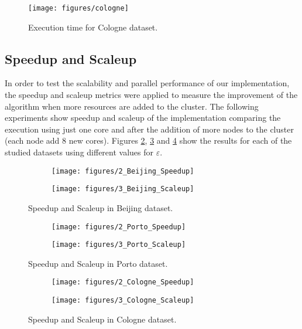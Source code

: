 \documentclass[12pt]{scrartcl}
\begin{document}
\begin{figure}
 \centering
 \texttt{[image: figures/cologne]} 
 \caption{Execution time for Cologne dataset.}
 \label{fig:cologne}
\end{figure}

\subsection{Speedup and Scaleup}
In order to test the scalability and parallel performance of our implementation, the speedup and scaleup metrics were applied to measure the improvement of the algorithm when more resources are added to the cluster.  The following experiments show speedup and scaleup of the implementation comparing the execution using just one core and after the addition of more nodes to the cluster (each node add 8 new cores).  Figures \ref{fig:SSBeijing}, \ref{fig:SSPorto} and \ref{fig:SSCologne} show the results for each of the studied datasets using different values for $\varepsilon$.

\begin{figure}
\centering
\begin{subfigure}{.5\textwidth}
  \centering \texttt{[image: figures/2\_Beijing\_Speedup]}
\end{subfigure}%
\begin{subfigure}{.5\textwidth}
  \centering \texttt{[image: figures/3\_Beijing\_Scaleup]}
\end{subfigure}
\caption{Speedup and Scaleup in Beijing dataset.}
\label{fig:SSBeijing}
\end{figure}

\begin{figure}
\centering
\begin{subfigure}{.5\textwidth}
  \centering \texttt{[image: figures/2\_Porto\_Speedup]}
\end{subfigure}%
\begin{subfigure}{.5\textwidth}
  \centering \texttt{[image: figures/3\_Porto\_Scaleup]}
\end{subfigure}
\caption{Speedup and Scaleup in Porto dataset.}
\label{fig:SSPorto}
\end{figure}

\begin{figure}
\centering
\begin{subfigure}{.5\textwidth}
  \centering \texttt{[image: figures/2\_Cologne\_Speedup]}
\end{subfigure}%
\begin{subfigure}{.5\textwidth}
  \centering \texttt{[image: figures/3\_Cologne\_Scaleup]}
\end{subfigure}
\caption{Speedup and Scaleup in Cologne dataset.}
\label{fig:SSCologne}
\end{figure}
\end{document}

